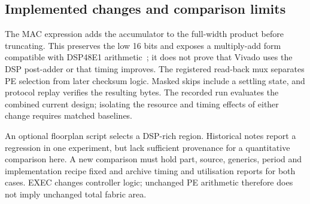 \subsection{Implemented changes and comparison limits}
\label{sec:walls}

The MAC expression adds the accumulator to the full-width product before
truncating. This preserves the low 16 bits and exposes a multiply-add form
compatible with DSP48E1 arithmetic~\cite{ug479}; it does not prove that Vivado
uses the DSP post-adder or that timing improves. The registered read-back mux
separates PE selection from later checksum logic. Masked skips include a
settling state, and protocol replay verifies the resulting bytes. The recorded run evaluates the combined current design; isolating the
resource and timing effects of either change requires matched baselines.

\label{sec:floorplan}
An optional floorplan script selects a DSP-rich region. Historical notes
report a regression in one experiment, but lack sufficient provenance for a
quantitative comparison here. A new comparison must hold part, source,
generics, period and implementation recipe fixed and archive timing and
utilisation reports for both cases. EXEC changes controller logic; unchanged
PE arithmetic therefore does not imply unchanged total fabric area.

